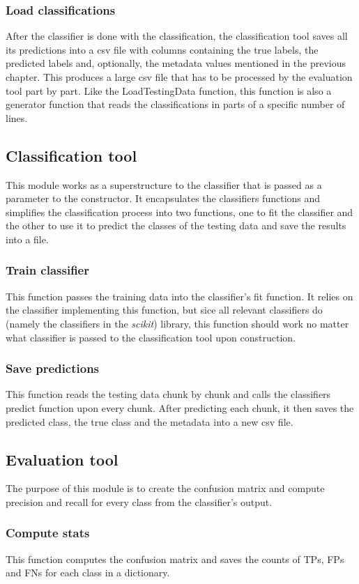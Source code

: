 \documentclass[11pt]{article}
\begin{document}
      \subsubsection{Load classifications}
        After the classifier is done with the classification, the classification tool saves all its predictions into a csv file with columns containing the true labels, the predicted labels and, optionally, the metadata values mentioned in the previous chapter. This produces a large csv file that has to be processed by the evaluation tool part by part. Like the LoadTestingData function, this function is also a generator function that reads the classifications in parts of a specific number of lines.
    \newpage
    \subsection{Classification tool}
      This module works as a superstructure to the classifier that is passed as a parameter to the constructor. It encapsulates the classifiers functions and simplifies the classification process into two functions, one to fit the classifier and the other to use it to predict the classes of the testing data and save the results into a file.
      \subsubsection{Train classifier}
        This function passes the training data into the classifier's fit function. It relies on the classifier implementing this function, but sice all relevant classifiers do (namely the classifiers in the {\it scikit}) library, this function should work no matter what classifier is passed to the classification tool upon construction.
      \subsubsection{Save predictions}
        This function reads the testing data chunk by chunk and calls the classifiers predict function upon every chunk. After predicting each chunk, it then saves the predicted class, the true class and the metadata into a new csv file.
    \subsection{Evaluation tool}
      The purpose of this module is to create the confusion matrix and compute precision and recall for every class from the classifier's output.
      \subsubsection{Compute stats}
        This function computes the confusion matrix and saves the counts of TPs, FPs and FNs for each class in a dictionary.
\end{document}
